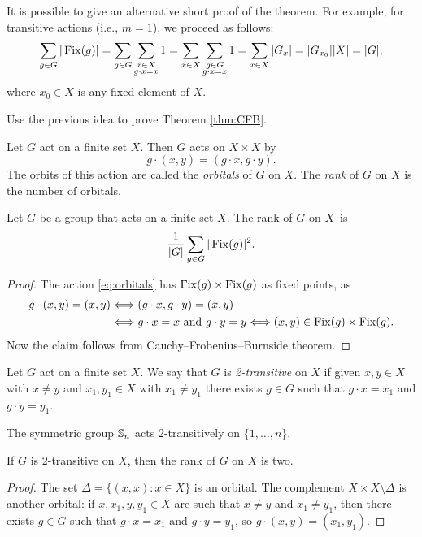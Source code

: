 It is possible to give an alternative short proof of the theorem. For example, 
for transitive actions (i.e., $m=1$), we proceed as follows:
\[
\sum_{g\in G}|\operatorname{Fix}(g)|=\sum_{g\in G}\sum_{\substack{x\in X\\g\cdot x=x}}1
=\sum_{x\in X}\sum_{\substack{g\in G\\g\cdot x=x}}1
=\sum_{x\in X}|G_x|=|G_{x_0}||X|=|G|,
\]
where $x_0\in X$ is any fixed element of $X$.  

\begin{exercise}
\label{xca:CFB}
    Use the previous idea to prove Theorem \ref{thm:CFB}. 
\end{exercise}

Let $G$ act on a finite set $X$. Then $G$ acts
on $X\times X$ by
\begin{equation}
    \label{eq:orbitals}
    g\cdot (x,y)=(g\cdot x,g\cdot y).
\end{equation}
The orbits of this action are called
the \emph{orbitals} of $G$ on $X$. The \emph{rank} 
of $G$ on $X$ is the number of orbitals. 

\begin{proposition}
    Let $G$ be a group that acts on a finite set $X$.
    The rank of $G$ on $X$~is 
    \[
    \frac{1}{|G|}\sum_{g\in G}|\operatorname{Fix}(g)|^2.
    \]
\end{proposition}

\begin{proof}
    The action \eqref{eq:orbitals} has 
    $\operatorname{Fix}(g)\times\operatorname{Fix}(g)$ as fixed points, as 
    \begin{align*}
        g\cdot (x,y)=(x,y)&\Longleftrightarrow
        (g\cdot x,g\cdot y)=(x,y)\\
        &\Longleftrightarrow g\cdot x=x\text{ and }g\cdot y=y\Longleftrightarrow
        (x,y)\in\operatorname{Fix}(g)\times\operatorname{Fix}(g).
    \end{align*}
    Now the claim follows from Cauchy--Frobenius--Burnside theorem. 
\end{proof}

\begin{definition}
    Let $G$ act on a finite set $X$. 
    We say that $G$ is \emph{2-transitive} on $X$ 
    if given $x,y\in X$ with $x\ne y$ and 
    $x_1,y_1\in X$ with $x_1\ne y_1$ there exists 
    $g\in G$ such that $g\cdot x=x_1$ and $g\cdot y=y_1$. 
\end{definition}

The symmetric group $\mathbb{S}_n$ acts 2-transitively on $\{1,\dots,n\}$. 

\begin{proposition}
    If $G$ is 2-transitive on $X$, then the rank of $G$ on $X$ is two. 
\end{proposition}

\begin{proof}
    The set $\Delta=\{(x,x):x\in X\}$ is an orbital. The complement
    $X\times X\setminus\Delta$ is another orbital: if $x,x_1,y,y_1\in X$
    are such that $x\ne y$ 
    and $x_1\ne y_1$, then there exists $g\in G$ such that 
    $g\cdot x=x_1$ and $g\cdot y=y_1$, so $g\cdot (x,y)=(x_1,y_1)$. 
\end{proof}
